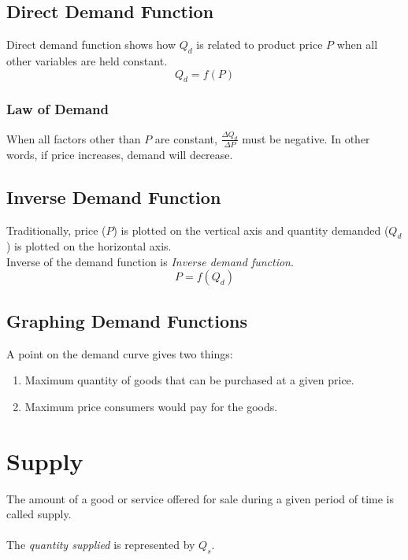 \documentclass[oneside]{book}
\begin{document}
\subsection{Direct Demand Function}
Direct demand function shows how \(Q_d\) is related to product price \(P\) when all other variables are held constant.
\[
	Q_d = f(P)
\]
\subsubsection{Law of Demand}
When all factors other than \(P\) are constant, \(\displaystyle \frac{\Delta Q_d}{\Delta P}\) must be negative. In other words, if price increases, demand will decrease.

\subsection{Inverse Demand Function}
Traditionally, price (\(P\)) is plotted on the vertical axis and quantity demanded (\(Q_d\)) is plotted on the horizontal axis.\\
Inverse of the demand function is \textit{Inverse demand function}.
\[
	P = f(Q_d)
\]

\subsection{Graphing Demand Functions}
A point on the demand curve gives two things:
\begin{enumerate}
	\item Maximum quantity of goods that can be purchased at a given price.
	\item Maximum price consumers would pay for the goods.
\end{enumerate}

\section{Supply}
The amount of a good or service offered for sale during a given period of time is called supply.
\\\\
The \textit{quantity supplied} is represented by \(Q_s\).
\end{document}
